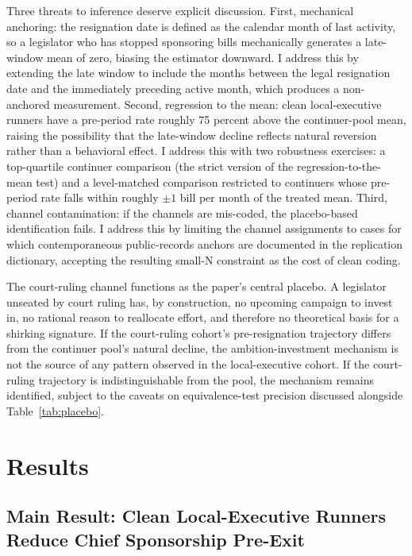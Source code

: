 \documentclass[11pt]{article}
\begin{document}
Three threats to inference deserve explicit discussion. First, mechanical anchoring: the resignation date is defined as the calendar month of last activity, so a legislator who has stopped sponsoring bills mechanically generates a late-window mean of zero, biasing the estimator downward. I address this by extending the late window to include the months between the legal resignation date and the immediately preceding active month, which produces a non-anchored measurement. Second, regression to the mean: clean local-executive runners have a pre-period rate roughly 75 percent above the continuer-pool mean, raising the possibility that the late-window decline reflects natural reversion rather than a behavioral effect. I address this with two robustness exercises: a top-quartile continuer comparison (the strict version of the regression-to-the-mean test) and a level-matched comparison restricted to continuers whose pre-period rate falls within roughly $\pm 1$ bill per month of the treated mean. Third, channel contamination: if the channels are mis-coded, the placebo-based identification fails. I address this by limiting the channel assignments to cases for which contemporaneous public-records anchors are documented in the replication dictionary, accepting the resulting small-N constraint as the cost of clean coding.

The court-ruling channel functions as the paper's central placebo. A legislator unseated by court ruling has, by construction, no upcoming campaign to invest in, no rational reason to reallocate effort, and therefore no theoretical basis for a shirking signature. If the court-ruling cohort's pre-resignation trajectory differs from the continuer pool's natural decline, the ambition-investment mechanism is not the source of any pattern observed in the local-executive cohort. If the court-ruling trajectory is indistinguishable from the pool, the mechanism remains identified, subject to the caveats on equivalence-test precision discussed alongside Table~\ref{tab:placebo}.

\section{Results}\label{sec:results}

\subsection{Main Result: Clean Local-Executive Runners Reduce Chief Sponsorship Pre-Exit}
\end{document}
